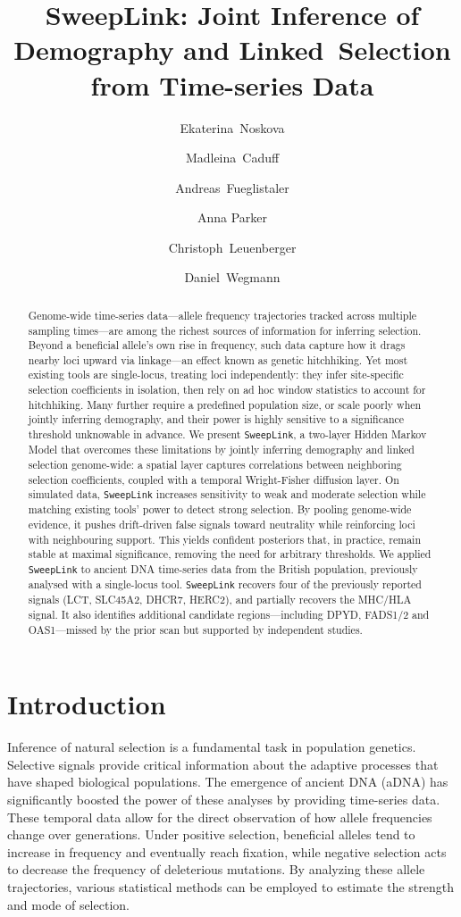 \documentclass{article}
\title{SweepLink: Joint Inference of Demography and Linked~Selection from Time-series Data}
\author[1,2,3]{Ekaterina~Noskova}
\author[1,2]{Madleina~Caduff}
\author[1,2]{Andreas~Fueglistaler}
\author[1]{Anna Parker}
\author[3]{Christoph~Leuenberger}
\author[1,2]{Daniel~Wegmann}
\affil[1]{Department of Biology, University of Fribourg, 1700 Fribourg, Switzerland}
\affil[2]{Swiss Institute of Bioinformatics, 1700 Fribourg, Switzerland }
\affil[3]{Institute of Ecology and Evolution, University of Edinburgh, EH9 3DW Edinburgh, United Kingdom}
\affil[4]{Department of Mathematics, University of Fribourg, 1700 Fribourg, Switzerland}
\newcommand{\SweepLink}{\texttt{SweepLink}\xspace}
\begin{document}
\maketitle
\linenumbers

\begin{abstract} %
Genome-wide time-series data---allele frequency trajectories tracked across multiple sampling times---are among the richest sources of information for inferring selection.
Beyond a beneficial allele's own rise in frequency, such data capture how it drags nearby loci upward via linkage---an effect known as genetic hitchhiking.
Yet most existing tools are single-locus, treating loci independently: they infer site-specific selection coefficients in isolation, then rely on ad hoc window statistics to account for hitchhiking.
Many further require a predefined population size, or scale poorly when jointly inferring demography, and their power is highly sensitive to a significance threshold unknowable in advance.
We present \SweepLink, a two-layer Hidden Markov Model that overcomes these limitations by jointly inferring demography and linked selection genome-wide: a spatial layer captures correlations between neighboring selection coefficients, coupled with a temporal Wright-Fisher diffusion layer.
On simulated data, \SweepLink increases sensitivity to weak and moderate selection while matching existing tools' power to detect strong selection.
By pooling genome-wide evidence, it pushes drift-driven false signals toward neutrality while reinforcing loci with neighbouring support.
This yields confident posteriors that, in practice, remain stable at maximal significance, removing the need for arbitrary thresholds.
We applied \SweepLink to ancient DNA time-series data from the British population, previously analysed with a single-locus tool.
\SweepLink recovers four of the previously reported signals (LCT, SLC45A2, DHCR7, HERC2), and partially recovers the MHC/HLA signal.
It also identifies additional candidate regions---including DPYD, FADS1/2 and OAS1---missed by the prior scan but supported by independent studies.
\end{abstract}


\section{Introduction}

Inference of natural selection is a fundamental task in population genetics.
Selective signals provide critical information about the adaptive processes that have shaped biological populations.
The emergence of ancient DNA (aDNA) has significantly boosted the power of these analyses by providing time-series data.
These temporal data allow for the direct observation of how allele frequencies change over generations.
Under positive selection, beneficial alleles tend to increase in frequency and eventually reach fixation, while negative selection acts to decrease the frequency of deleterious mutations.
By analyzing these allele trajectories, various statistical methods can be employed to estimate the strength and mode of selection.
\end{document}
